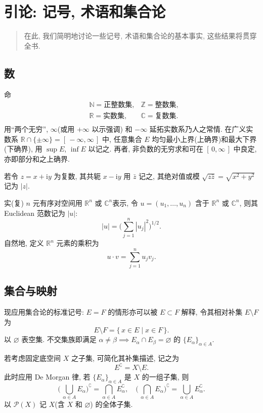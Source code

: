 \chapter{引论: 记号, 术语和集合论}
\begin{quote}
    在此, 我们简明地讨论一些记号, 术语和集合论的基本事实, 这些结果将贯穿全书.
\end{quote}
\section{数}
命
\[
    \begin{aligned}
         & \mathbb N  =\textit{正整数集},
         & \mathbb Z  =\textit{整数集},   \\
         & \mathbb R  =\textit{实数集},
         & \mathbb C  =\textit{复数集}.   \\
    \end{aligned}
\]
用``两个无穷'', $\infty$(或用 $+\infty$ 以示强调) 和 $-\infty$ 延拓实数系乃人之常情. 在广义实数系 $\mathbb R\cap\{\pm\infty\}=[\,-\infty,\infty\,]$ 中, 任意集合 $E$ 均匀最小上界(上确界)和最大下界(下确界), 用 $\sup E$, $\inf E$ 以记之. 再者, 非负数的无穷求和可在 $[\,0,\infty\,]$ 中良定, 亦即部分和之上确界.

若令 $z=x+\mathrm iy$ 为复数, 其共轭 $x-\mathrm iy$ 用 $\bar z$ 记之, 其绝对值或模 $\sqrt{z\bar z} = \sqrt{x^2 + y^2}$ 记为 $|z|$.

实(复) $n$ 元有序对空间用 $\mathbb R^n$ 或 $\mathbb C^n$表示, 令 $u=(u_1,\dots,u_n)$ 含于 $\mathbb R^n$ 或 $\mathbb C^n$, 则其 Euclidean 范数记为 $|u|$:
\[
    |u| = \biggl( \sum_{j=1}^n |u_j|^2 \biggr) ^{1 /2}
    .\]
自然地, 定义 $\mathbb R^n$ 元素的乘积为
\[
    u\cdot v=\sum_{j=1}^n u_j v_j
    .\]
\section{集合与映射}
现应用集合论的标准记号: $E=F$ 的情形亦可以被 $E\subset F$ 解释, 令其相对补集 $E\setminus F$ 为
\[
    E\setminus F = \{\, x\in E \mid x\in F \,\}.
\]
以 $\varnothing$ 表空集. 不交集族即满足 $\alpha \neq \beta \implies E_\alpha\cap E_ \beta =\varnothing$ 的 $\{E_\alpha\}_{\alpha\in A}$.

若考虑固定底空间 $X$ 之子集, 可简化其补集描述, 记之为
\[
    E^\complement  = X\setminus E.
\]
此时应用 De Morgan 律, 若 $\{E_\alpha\}_{\alpha\in A}$ 是 $X$ 的一组子集, 则
\[
    \biggl(\, \bigcup_{\alpha\in A}E_\alpha \biggr)^\complement = \bigcap_{\alpha\in A}E_\alpha^\complement,\quad\biggl(\, \bigcap_{\alpha\in A}E_\alpha \biggr)^\complement = \bigcup_{\alpha\in A}E_\alpha^\complement.
\]
以 $\mathcal P(X)$ 记 $X$(含 $X$ 和 $\varnothing$) 的全体子集.

